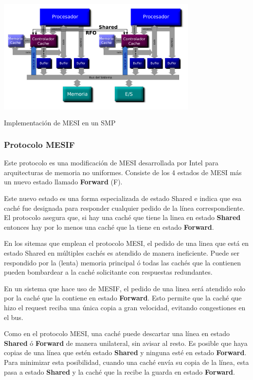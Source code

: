 \begin{minipage}{\textwidth}	\centering
	\includegraphics[width=0.75\textwidth]{imagenes/mesi-implementation}

	Implementación de MESI en un SMP
	\label{fig:mesiImplementation}
\end{minipage}

\subsubsection{Protocolo MESIF}
Este protocolo es una modificación de MESI desarrollada por Intel para arquitecturas de memoria no uniformes. Consiste de los 4 estados de MESI más un nuevo estado llamado \textbf{Forward} (F).

Este nuevo estado es una forma especializada de estado Shared e indica que esa caché fue designada para responder cualquier pedido de la línea correspondiente. El protocolo asegura que, si hay una caché que tiene la linea en estado \textbf{Shared} entonces hay por lo menos una caché que la tiene en estado \textbf{Forward}.

En los sitemas que emplean el protocolo MESI, el pedido de una linea que está en estado Shared en múltiples cachés es atendido de manera ineficiente. Puede ser respondido por la (lenta) memoria principal ó todas las cachés que la contienen pueden bombardear a la caché solicitante con respuestas redundantes.

En un sistema que hace uso de MESIF, el pedido de una linea será atendido solo por la caché que la contiene en estado \textbf{Forward}. Esto permite que la caché que hizo el request reciba una única copia a gran velocidad, evitando congestiones en el bus.

Como en el protocolo MESI, una caché puede descartar una línea en estado \textbf{Shared} ó \textbf{Forward} de manera unilateral, sin avisar al resto. Es posible que haya copias de una línea que estén estado \textbf{Shared} y ninguna esté en estado \textbf{Forward}. Para minimizar esta posibilidad, cuando una caché envía su copia de la línea, esta pasa a estado \textbf{Shared} y la caché que la recibe la guarda en estado \textbf{Forward}.
